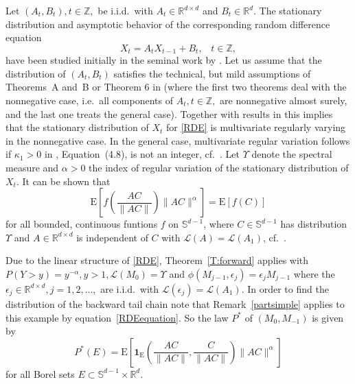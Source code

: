 \documentclass{aptpubarxiv}
\numberwithin{equation}{section}
\begin{document}
\begin{ex}
\label{Ex:KestenRDE}
Let $(A_t, B_t), t \in \mathbb{Z},$ be i.i.d.\ with $A_t \in \mathbb{R}^{d \times d}$ and $B_t \in \mathbb{R}^d$. The stationary distribution and asymptotic behavior of the corresponding random difference equation 
\begin{equation}\label{RDE} X_{t}=A_t X_{t-1} + B_t, \;\;\; t \in \mathbb{Z},\end{equation}
have been studied initially in the seminal work by \cite{Kesten73}. Let us assume that the distribution of $(A_t, B_t)$ satisfies the technical, but mild assumptions of Theorems~A and~B or Theorem 6 in \cite{Kesten73} (where the first two theorems deal with the nonnegative case, i.e.\ all components of $A_t, t \in \mathbb{Z},$ are nonnegative almost surely, and the last one treats the general case). Together with results in \cite{BL09} this implies that the stationary distribution of $X_t$ for \eqref{RDE} is multivariate regularly varying in the nonnegative case. In the general case, multivariate regular variation follows if $\kappa_1>0$ in \cite{Kesten73}, Equation~(4.8), is not an integer, cf.\ \cite{BDM02a}. Let $\Upsilon$ denote the spectral measure and $\alpha>0$ the index of regular variation of the stationary distribution of $X_t$. It can be shown that
\begin{equation}\label{RDEequation} {\mathrm{E}}\left[f\left(\frac{AC}{\| AC\|} \right)\|AC\|^\alpha \right]={\mathrm{E}}[f(C)] \end{equation}
for all bounded, continuous funtions $f$ on $\mathbb{S}^{d-1}$, where $C \in \mathbb{S}^{d-1}$ has distribution $\Upsilon$ and $A \in \mathbb{R}^{d \times d}$ is independent of $C$ with $\mathcal{L}(A)=\mathcal{L}(A_1)$, cf.\ \cite{BS09}. 

Due to the linear structure of \eqref{RDE}, Theorem~\ref{T:forward} applies with $P(Y>y)=y^{-\alpha}, y>1, \mathcal{L}(M_0)=\Upsilon$ and $\phi(M_{j-1}, \epsilon_j)=\epsilon_j M_{j-1}$ where the $\epsilon_j \in \mathbb{R}^{d \times d}, j=1,2,\ldots,$ are i.i.d.\ with $\mathcal{L}(\epsilon_j)=\mathcal{L}(A_1)$. In order to find the distribution of the backward tail chain note that Remark~\ref{partsimple} applies to this example by equation~\eqref{RDEequation}. So the law $P^\ast$ of $(M_{0},M_{-1})$ is given by
\begin{equation}\label{simpleRDEadjoint}P^\ast(E)={\mathrm{E}}\left[ {\boldsymbol{1}}_{\mathrm{E}}\left(\frac{AC}{\|AC\|},\frac{C}{\|AC\|} \right)\|AC\|^\alpha \right]\end{equation}
for all Borel sets $E \subset \mathbb{S}^{d-1}\times \mathbb{R}^d$.


\end{ex}
\end{document}
